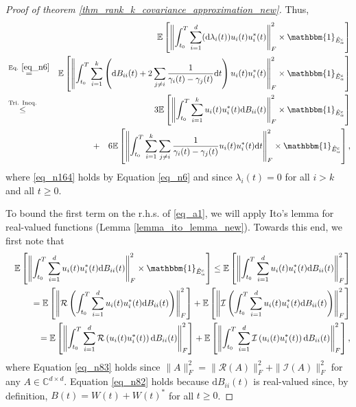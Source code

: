 \documentclass[11pt,letterpaper]{article}
\begin{document}
\begin{proof}[Proof of theorem \ref{thm_rank_k_covariance_approximation_new}]
 Thus,
 \begin{eqnarray}
    & &   \!\!\!\!\!\!\!\!\!\!\!\!\! \! \!\! \! \!\!\!\!\!\!\!\!\!\!\!\!\!\!\!\! \! \!\! \! \!\!\!\!\!\!\!\!\!\!\!\!\!\!\!\! \! \!\mathbb{E}\left[\left\|\int_{t_0}^T \sum_{i=1}^d (\mathrm{d} \lambda_i(t))  u_i(t) u_i^\ast(t)\right\|_F^2  \times \mathbbm{1}_{\hat{E}_\alpha^c} \right]\nonumber\\
       &\stackrel{\textrm{Eq. } \eqref{eq_n6}}{=}&\mathbb{E}\left[\left\|\int_{t_0}^T \sum_{i=1}^k \left(\mathrm{d}B_{i i}(t) +  2 \sum_{j \neq i} \frac{1}{\gamma_i(t) - \gamma_j(t)} \mathrm{d}t \right) u_i(t) u_i^\ast(t)\right\|_F^2 \times \mathbbm{1}_{\hat{E}_\alpha^c} \right] \label{eq_n164}\\
     &\stackrel{\textrm{Tri. Ineq.}}{\leq} & 3\mathbb{E}\left[\left\|\int_{t_0}^T \sum_{i=1}^k  u_i(t) u_i^\ast(t) \mathrm{d}B_{i i}(t) \right\|_F^2 \times \mathbbm{1}_{\hat{E}_\alpha^c} \right] \nonumber\\
     & & + \quad  6 \mathbb{E}\left[\left\|\int_{t_0}^T \sum_{i=1}^k \sum_{j \neq i} \frac{1}{\gamma_i(t) - \gamma_j(t)}  u_i(t) u_i^\ast(t) \mathrm{d}t\right\|_F^2 \times \mathbbm{1}_{\hat{E}_\alpha^c} \right], \label{eq_a1}
 \end{eqnarray}
%    
where \eqref{eq_n164} holds by Equation \eqref{eq_n6} and since $\lambda_i(t) = 0$ for all $i> k$ and all $t \geq 0$. 

    To bound the first term on the r.h.s. of \eqref{eq_a1}, we will apply Ito's lemma for real-valued functions (Lemma \ref{lemma_ito_lemma_new}).
     Towards this end, we first note that
%
\begin{eqnarray}
& & \mathbb{E}\left[\left\|\int_{t_0}^T \sum_{i=1}^d  u_i(t) u_i^\ast(t) \mathrm{d}B_{i i}(t) \right\|_F^2 \times \mathbbm{1}_{\hat{E}_\alpha^c} \right]
         \leq   \mathbb{E}\left[\left\|\int_{t_0}^T \sum_{i=1}^d  u_i(t) u_i^\ast(t) \mathrm{d}B_{i i}(t) \right\|_F^2 \right] \nonumber\\
%
         && \qquad =   \mathbb{E}\left[\left\| \mathcal{R}\left(\int_{t_0}^T \sum_{i=1}^d  u_i(t) u_i^\ast(t) \mathrm{d}B_{i i}(t) \right) \right\|_F^2 \right]
        + \mathbb{E}\left[\left\| \mathcal{I}\left(\int_{t_0}^T \sum_{i=1}^d  u_i(t) u_i^\ast(t) \mathrm{d}B_{i i}(t) \right) \right\|_F^2 \right] \label{eq_n83}\\
                & & \qquad =   \mathbb{E}\left[\left\| \int_{t_0}^T \sum_{i=1}^d  \mathcal{R}\left(u_i(t) u_i^\ast(t)\right) \mathrm{d}B_{i i}(t)  \right\|_F^2 \right] + \mathbb{E}\left[\left\| \int_{t_0}^T \sum_{i=1}^d  \mathcal{I}\left(u_i(t) u_i^\ast(t)\right) \mathrm{d}B_{i i}(t)  \right\|_F^2 \right], \label{eq_n82}
%
         \end{eqnarray}
         where Equation \eqref{eq_n83} holds since $\|A\|_F^2 = \|\mathcal{R}(A)\|_F^2 + \|\mathcal{I}(A)\|_F^2$ for any $A \in \mathbb{C}^{d \times d}$. 
         Equation \eqref{eq_n82} holds because $\mathrm{d}B_{i i}(t)$ is real-valued since, by definition, $B(t) = W(t) + W(t)^\ast$ for all $ t \geq 0$.


\end{proof}
\end{document}
